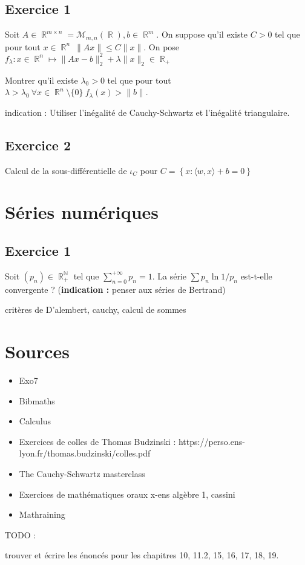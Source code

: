 \documentclass{article}
\DeclareMathOperator{\R}{\mathbb{R}}
\DeclareMathOperator{\N}{\mathbb{N}}
\begin{document}
\subsection*{Exercice 1 } 

Soit $A\in \R^{m\times n} = \mathcal{M}_{m, n}(\R), b \in \R^m$. On suppose qu'il existe $C>0$ tel que pour tout $x \in \R^n \ \|Ax\| \leqslant C\|x\|$. On pose $f_{\lambda} : x\in \R^n \mapsto \|Ax - b\|_2^2 + \lambda \|x\|_2 \in \R_+$  

Montrer qu'il existe $\lambda_0 > 0$ tel que pour tout $\lambda > \lambda_0 \ \forall x \in \R^n\setminus \{0\} \ f_{\lambda}(x) > \|b\|$.  

indication : Utiliser l'inégalité de Cauchy-Schwartz et l'inégalité triangulaire. 

\subsection*{Exercice 2} 

Calcul de la sous-différentielle de $\iota_C$ pour $C = \left\{ x : \langle w, x \rangle + b = 0\right\}$  

\clearpage

\section{Séries numériques} 

\subsection*{Exercice 1} 

Soit $(p_n)\in \R_+^{\N}$ tel que $\displaystyle \sum_{n=0}^{+\infty}{p_n} = 1$. La série $ \displaystyle \sum{p_n \ln{1/p_n}}$ est-t-elle convergente ? (\textbf{indication :} penser aux séries de Bertrand) 


critères de D'alembert, cauchy, calcul de sommes 

\clearpage

\section{Sources} 
\begin{itemize}
    \item Exo7 
    \item Bibmaths 
    \item Calculus 
    \item Exercices de colles de Thomas Budzinski : https://perso.ens-lyon.fr/thomas.budzinski/colles.pdf 
    \item The Cauchy-Schwartz masterclass 
    \item Exercices de mathématiques oraux x-ens algèbre 1, cassini 
    \item Mathraining 

\end{itemize}
\clearpage

TODO : 

trouver et écrire les énoncés pour les chapitres 10, 11.2, 15, 16, 17, 18, 19. 
\end{document}
